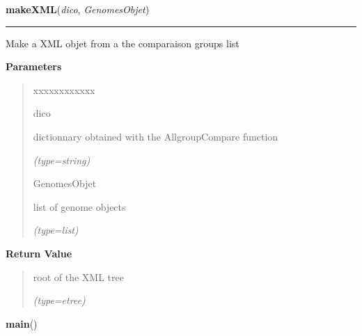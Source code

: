 \hspace{.8\funcindent}\begin{boxedminipage}{\funcwidth}

    \raggedright \textbf{makeXML}(\textit{dico}, \textit{GenomesObjet})

    \vspace{-1.5ex}

    \rule{\textwidth}{0.5\fboxrule}
\setlength{\parskip}{2ex}
    Make a XML objet from a the comparaison groups list

\setlength{\parskip}{1ex}
      \textbf{Parameters}
      \vspace{-1ex}

      \begin{quote}
        \begin{Ventry}{xxxxxxxxxxxx}

          \item[dico]

          dictionnary obtained with the AllgroupCompare function

            {\it (type=string)}

          \item[GenomesObjet]

          list of genome objects

            {\it (type=list)}

        \end{Ventry}

      \end{quote}

      \textbf{Return Value}
    \vspace{-1ex}

      \begin{quote}
      root of the XML tree

      {\it (type=etree)}

      \end{quote}

    \end{boxedminipage}

    \label{script-phyloFixedVar:main}

    \vspace{0.5ex}

\hspace{.8\funcindent}\begin{boxedminipage}{\funcwidth}

    \raggedright \textbf{main}()

\setlength{\parskip}{2ex}
\setlength{\parskip}{1ex}
    \end{boxedminipage}


